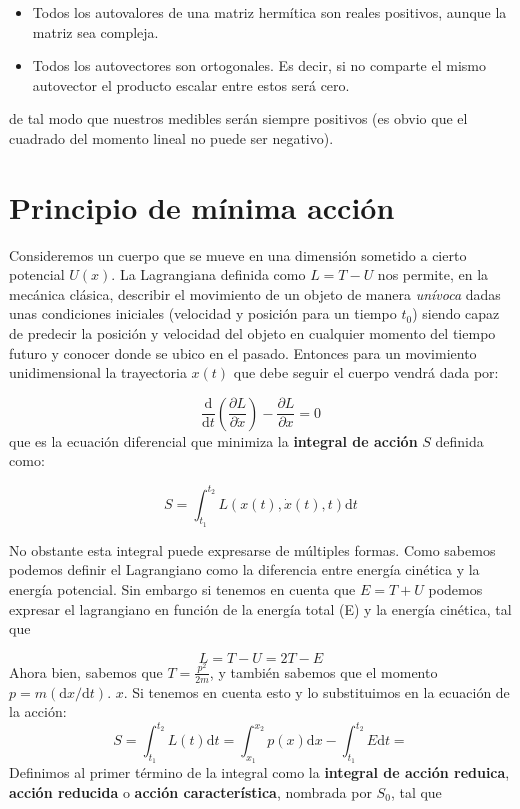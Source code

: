 \documentclass[12pt,a4paper]{article}
\numberwithin{equation}{section}
\numberwithin{figure}{section}
\newcommand{\parentesis}[1]{\left( #1  \right)}
\newcommand{\parciales}[2]{\frac{\partial #1}{\partial #2}}
\newcommand{\pparciales}[2]{\parentesis{\parciales{#1}{#2}}}
\newcommand{\D}{\mathrm{d}}
\newcommand{\derivadas}[2]{\frac{\D #1}{\D #2}}
\begin{document}
\begin{itemize}
\item Todos los autovalores de una matriz hermítica son reales positivos, aunque la matriz sea compleja.
\item Todos los autovectores son ortogonales. Es decir, si no comparte el mismo autovector el producto escalar entre estos será cero.
\end{itemize}

de tal modo que nuestros medibles serán siempre positivos (es obvio que el cuadrado del momento lineal no puede ser negativo).

\newpage

\section{Principio de mínima acción}

Consideremos un cuerpo que se mueve en una dimensión sometido a cierto potencial $U(x)$. La Lagrangiana definida como $L=T-U$ nos permite, en la mecánica clásica, describir el movimiento de un objeto de manera \textit{unívoca} dadas unas condiciones iniciales (velocidad y posición para un tiempo $t_0$) siendo capaz de predecir la posición y velocidad del objeto en cualquier momento del tiempo futuro y conocer donde se ubico en el pasado. Entonces para un movimiento unidimensional la trayectoria $x(t)$ que debe seguir el cuerpo vendrá dada por:

\begin{equation}
\derivadas{}{t} \pparciales{L}{\dot{x}} - \parciales{L}{x} = 0
\end{equation}
que es la ecuación diferencial que minimiza la \textbf{integral de acción} $S$ definida como:

\begin{equation}
S = \int_{t_1}^{t_2} L(x(t),\dot{x}(t),t) \D t
\end{equation}

No obstante esta integral puede expresarse de múltiples formas. Como sabemos podemos definir el Lagrangiano como la diferencia entre energía cinética y la energía potencial. Sin embargo si tenemos en cuenta que $E = T + U$ podemos expresar el lagrangiano en función de la energía total (E) y la energía cinética, tal que

\begin{equation}
L = T - U = 2 T - E 
\end{equation}
Ahora bien, sabemos que $T = \frac{p^2}{2 m}$, y también sabemos que el momento $p = m (\D x / \D t)$. $x$. Si tenemos en cuenta esto y lo substituimos en la ecuación de la acción:
\begin{equation}
S = \int_{t_1}^{t_2} L(t) \D t =  \int_{x_1}^{x_2} p(x) \D x   - \int_{t_1}^{t_2} E \D t  = 
\end{equation}
Definimos al primer término de la integral como la \textbf{integral de acción reduica}, \textbf{acción reducida} o \textbf{acción característica}, nombrada por $S_0$, tal que
\end{document}
